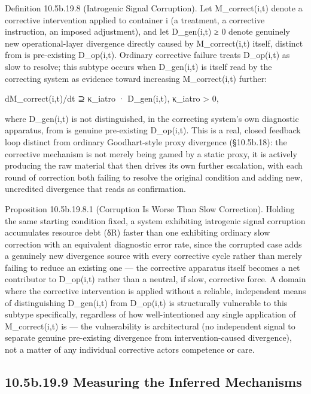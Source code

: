 \documentclass[
]{article}
\begin{document}
Definition 10.5b.19.8 (Iatrogenic Signal Corruption). Let
M\_correct(i,t) denote a corrective intervention applied to container i
(a treatment, a corrective instruction, an imposed adjustment), and let
D\_gen(i,t) ≥ 0 denote genuinely new operational-layer divergence
directly caused by M\_correct(i,t) itself, distinct from is pre-existing
D\_op(i,t). Ordinary corrective failure treats D\_op(i,t) as slow to
resolve; this subtype occurs when D\_gen(i,t) is itself read by the
correcting system as evidence toward increasing M\_correct(i,t) further:

dM\_correct(i,t)/dt ⊇ κ\_iatro · D\_gen(i,t), κ\_iatro \textgreater{} 0,

where D\_gen(i,t) is not distinguished, in the correcting system's own
diagnostic apparatus, from is genuine pre-existing D\_op(i,t). This is a
real, closed feedback loop distinct from ordinary Goodhart-style proxy
divergence (§10.5b.18): the corrective mechanism is not merely being
gamed by a static proxy, it is actively producing the raw material that
then drives its own further escalation, with each round of correction
both failing to resolve the original condition and adding new,
uncredited divergence that reads as confirmation.

Proposition 10.5b.19.8.1 (Corruption Is Worse Than Slow Correction).
Holding the same starting condition fixed, a system exhibiting
iatrogenic signal corruption accumulates resource debt (δR) faster than
one exhibiting ordinary slow correction with an equivalent diagnostic
error rate, since the corrupted case adds a genuinely new divergence
source with every corrective cycle rather than merely failing to reduce
an existing one --- the corrective apparatus itself becomes a net
contributor to D\_op(i,t) rather than a neutral, if slow, corrective
force. A domain where the corrective intervention is applied without a
reliable, independent means of distinguishing D\_gen(i,t) from
D\_op(i,t) is structurally vulnerable to this subtype specifically,
regardless of how well-intentioned any single application of
M\_correct(i,t) is --- the vulnerability is architectural (no
independent signal to separate genuine pre-existing divergence from
intervention-caused divergence), not a matter of any individual
corrective actors competence or care.

\hypertarget{b.19.9-measuring-the-inferred-mechanisms}{%
\subsection{10.5b.19.9 Measuring the Inferred
Mechanisms}\label{b.19.9-measuring-the-inferred-mechanisms}}
\end{document}
